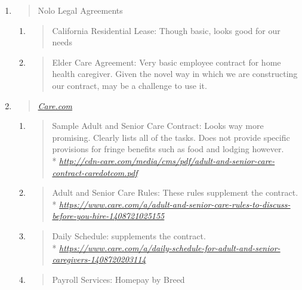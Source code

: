 \documentclass[]{article}
\date{}
\begin{document}
\begin{enumerate}
\def\labelenumi{\Roman{enumi}.}
\item
  \begin{quote}
  Nolo Legal Agreements
  \end{quote}

  \begin{enumerate}
  \def\labelenumii{\Alph{enumii}.}
  \item
    \begin{quote}
    California Residential Lease: Though basic, looks good for our needs
    \end{quote}
  \item
    \begin{quote}
    Elder Care Agreement: Very basic employee contract for home health
    caregiver. Given the novel way in which we are constructing our
    contract, may be a challenge to use it.
    \end{quote}
  \end{enumerate}
\item
  \begin{quote}
  \href{http://care.com}{\emph{Care.com}}
  \end{quote}

  \begin{enumerate}
  \def\labelenumii{\Alph{enumii}.}
  \item
    \begin{quote}
    Sample Adult and Senior Care Contract: Looks way more promising.
    Clearly lists all of the tasks. Does not provide specific provisions
    for fringe benefits such as food and lodging however. \\*
    \href{http://cdn-care.com/media/cms/pdf/adult-and-senior-care-contract-caredotcom.pdf}{\emph{http://cdn-care.com/media/cms/pdf/adult-and-senior-care-contract-caredotcom.pdf}}
    \end{quote}
  \item
    \begin{quote}
    Adult and Senior Care Rules: These rules supplement the contract.\\*
    \href{https://www.care.com/a/adult-and-senior-care-rules-to-discuss-before-you-hire-1408721025155}{\emph{https://www.care.com/a/adult-and-senior-care-rules-to-discuss-before-you-hire-1408721025155}}
    \end{quote}
  \item
    \begin{quote}
    Daily Schedule: supplements the contract.\\*
    \href{https://www.care.com/a/daily-schedule-for-adult-and-senior-caregivers-1408720203114}{\emph{https://www.care.com/a/daily-schedule-for-adult-and-senior-caregivers-1408720203114}}
    \end{quote}
  \item
    \begin{quote}
    Payroll Services: Homepay by Breed
    \end{quote}


\end{enumerate}
\end{enumerate}
\end{document}
